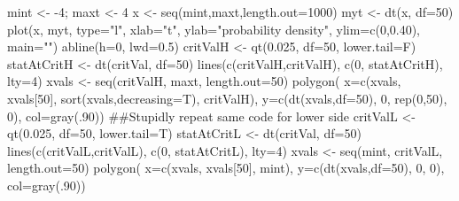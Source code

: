 \begin{Schunk}
\begin{Sinput}
 mint <- -4; maxt <- 4
 x <- seq(mint,maxt,length.out=1000)
 myt <- dt(x, df=50)
 plot(x, myt, type="l", xlab="t", ylab="probability density",  ylim=c(0,0.40), main="")
 abline(h=0, lwd=0.5)
 critValH <- qt(0.025, df=50, lower.tail=F)
 statAtCritH <- dt(critVal, df=50)
 lines(c(critValH,critValH), c(0, statAtCritH), lty=4)
 xvals <- seq(critValH, maxt, length.out=50)
 polygon( x=c(xvals, xvals[50], sort(xvals,decreasing=T), critValH), 
        y=c(dt(xvals,df=50), 0, rep(0,50), 0), col=gray(.90)) 
 ##Stupidly repeat same code for lower side
 critValL <- qt(0.025, df=50, lower.tail=T)
 statAtCritL <- dt(critVal, df=50)
 lines(c(critValL,critValL), c(0, statAtCritL), lty=4)
 xvals <- seq(mint, critValL,  length.out=50)
 polygon( x=c(xvals, xvals[50], mint), 
        y=c(dt(xvals,df=50), 0, 0), col=gray(.90)) 
\end{Sinput}
\end{Schunk}

